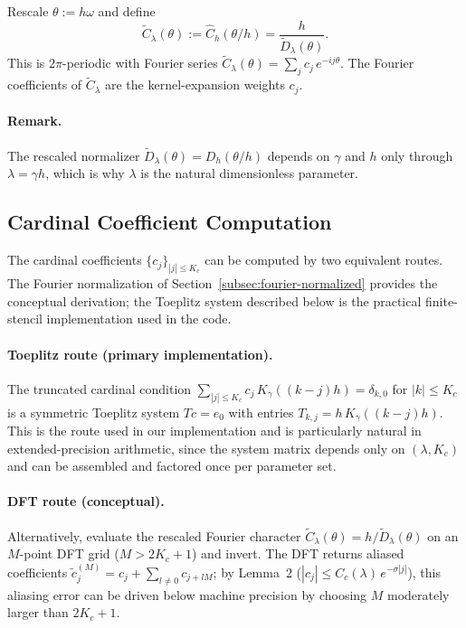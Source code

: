 \documentclass{article}
\begin{document}
Rescale \(\theta := h\omega\) and define
\[
  \widetilde{C}_\lambda(\theta) := \widehat{C}_h(\theta/h) = \frac{h}{\widetilde{D}_\lambda(\theta)}.
\]
This is \(2\pi\)-periodic with Fourier series \(\widetilde{C}_\lambda(\theta) = \sum_j c_j\,e^{-ij\theta}\).  The Fourier coefficients of \(\widetilde{C}_\lambda\) are the kernel-expansion weights \(c_j\).

\paragraph{Remark.}
The rescaled normalizer \(\widetilde{D}_\lambda(\theta) = D_h(\theta/h)\) depends on \(\gamma\) and \(h\) only through \(\lambda = \gamma h\), which is why \(\lambda\) is the natural dimensionless parameter.

\subsection{Cardinal Coefficient Computation}
\label{app:cardinal-computation}

The cardinal coefficients \(\{c_j\}_{|j|\le K_c}\) can be computed by two equivalent routes.  The Fourier normalization of Section~\ref{subsec:fourier-normalized} provides the conceptual derivation; the Toeplitz system described below is the practical finite-stencil implementation used in the code.

\paragraph{Toeplitz route (primary implementation).}
The truncated cardinal condition \(\sum_{|j|\le K_c} c_j\,K_\gamma((k-j)h) = \delta_{k,0}\) for \(|k|\le K_c\) is a symmetric Toeplitz system \(Tc = e_0\) with entries \(T_{k,j} = h\,K_\gamma((k-j)h)\).  This is the route used in our implementation and is particularly natural in extended-precision arithmetic, since the system matrix depends only on \((\lambda, K_c)\) and can be assembled and factored once per parameter set.

\paragraph{DFT route (conceptual).}
Alternatively, evaluate the rescaled Fourier character \(\widetilde{C}_\lambda(\theta) = h/\widetilde{D}_\lambda(\theta)\) on an \(M\)-point DFT grid (\(M > 2K_c+1\)) and invert.  The DFT returns aliased coefficients \(\widetilde{c}_j^{(M)} = c_j + \sum_{l\neq 0} c_{j+lM}\); by Lemma~2 (\(|c_j| \le C_c(\lambda)\,e^{-\sigma|j|}\)), this aliasing error can be driven below machine precision by choosing \(M\) moderately larger than \(2K_c+1\).
\end{document}
